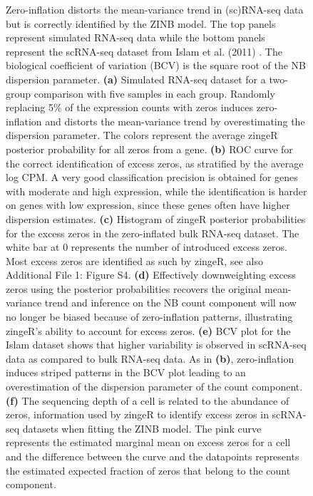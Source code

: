 \documentclass{bmcart}
\begin{document}
\begin{backmatter}
\begin{figure}[h!]
	\center
	\caption[introFigure]{Zero-inflation distorts the mean-variance trend in (sc)RNA-seq data but is correctly identified by the ZINB model. The top panels represent simulated RNA-seq data while the bottom panels represent the scRNA-seq dataset from Islam et al. (2011) \cite{Islam2011}. The biological coefficient of variation (BCV) is the square root of the NB dispersion parameter.
	\textbf{(a)} Simulated RNA-seq dataset for a two-group comparison with five samples in each group. Randomly replacing 5\% of the expression counts with zeros induces zero-inflation and distorts the mean-variance trend by overestimating the dispersion parameter. The colors represent the average zingeR posterior probability for all zeros from a gene.
	\textbf{(b)} ROC curve for the correct identification of excess zeros, as stratified by the average log CPM. A very good classification precision is obtained for genes with moderate and high expression, while the identification is harder on genes with low expression, since these genes often have higher dispersion estimates.
	\textbf{(c)} Histogram of zingeR posterior probabilities for the excess zeros in the zero-inflated bulk RNA-seq dataset. The white bar at $0$ represents the number of introduced excess zeros. Most excess zeros are identified as such by zingeR, see also Additional File 1: Figure S4.
	\textbf{(d)} Effectively downweighting excess zeros using the posterior probabilities recovers the original mean-variance trend and inference on the NB count component will now no longer be biased because of zero-inflation patterns, illustrating zingeR's ability to account for excess zeros.
	\textbf{(e)} BCV plot for the Islam dataset \cite{Islam2011} shows that higher variability is observed in scRNA-seq data as compared to bulk RNA-seq data. As in \textbf{(b)}, zero-inflation induces striped patterns in the BCV plot leading to an overestimation of the dispersion parameter of the count component.
	\textbf{(f)} The sequencing depth of a cell is related to the abundance of zeros, information used by zingeR to identify excess zeros in scRNA-seq datasets when fitting the ZINB model. The pink curve represents the estimated marginal mean on excess zeros for a cell and the difference between the curve and the datapoints represents the estimated expected fraction of zeros that belong to the count component.	
}
\end{figure}
\end{backmatter}
\end{document}
